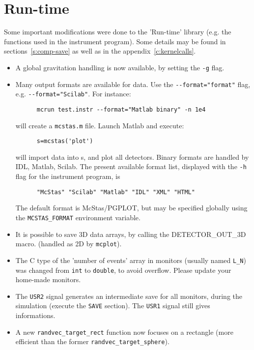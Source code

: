 \section{Run-time} 
\label{s:new-features:run-time}

Some important modifications were done to the 'Run-time' library (e.g. the functions used in the instrument program). Some details may be found in sections~\ref{s:comp-save} as well as in the appendix~\ref{c:kernelcalls}.

\begin{itemize}
\item A global gravitation handling is now available, by setting the \verb+-g+ flag.
\item Many output formats are available for data. Use the \verb+--format="format"+
    flag, e.g. \verb+--format="Scilab"+. For instance:
    \begin{verbatim}
      mcrun test.instr --format="Matlab binary" -n 1e4
    \end{verbatim}
    will create a \verb+mcstas.m+ file. Launch Matlab and execute:
    \begin{verbatim}
      s=mcstas('plot')
    \end{verbatim}
    will import data into s, and plot all detectors.
    Binary formats are handled by IDL, Matlab, Scilab.
    The present available format list, displayed with
    the \verb+-h+ flag for the instrument program, is
    \begin{verbatim}
      "McStas" "Scilab" "Matlab" "IDL" "XML" "HTML" 
    \end{verbatim}
    The default format is McStas/PGPLOT, but may be specified globally using
    the \verb+MCSTAS_FORMAT+ environment variable. 
     
\item It is possible to save 3D data arrays, by calling the DETECTOR\_OUT\_3D macro.
    (handled as 2D by \verb+mcplot+). 
\item The C type of the 'number of events' array in monitors (usually named
    \verb+L_N+) was changed from \verb+int+ to \verb+double+, to avoid overflow.
    Please update your home-made monitors.
\item The \verb+USR2+ signal generates an intermediate save for all monitors, during
    the simulation (execute the \texttt{SAVE} section). The \verb+USR1+ signal still
    gives informations. 
\item A new \verb+randvec_target_rect+ function now focuses on a rectangle (more
    efficient than the former \verb+randvec_target_sphere+).
\end{itemize}


